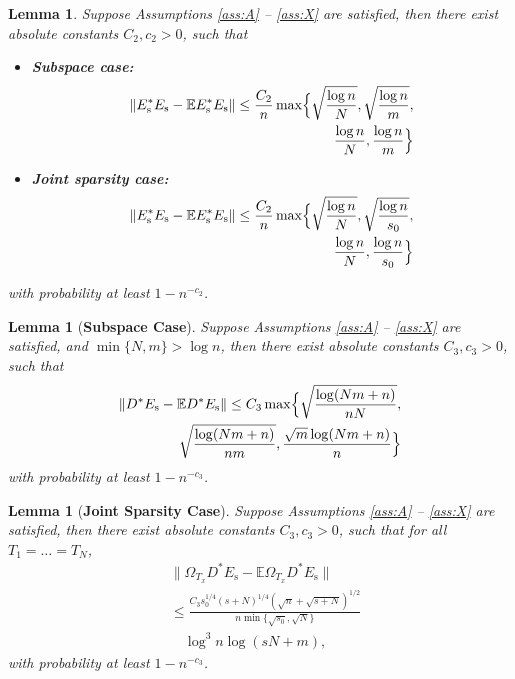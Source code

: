 \documentclass[11pt,journal]{IEEEtran}
\newcommand{\bbE}{\mathbb{E}}
\newcommand{\rms}{\mathrm{s}}
\newcommand{\norm}[1]{\|{#1}\|}
\newtheorem{lemma}[theorem]{Lemma}
\begin{document}
\begin{lemma} \label{lem:EsstarEs}
Suppose Assumptions \ref{ass:A} -- \ref{ass:X} are satisfied, then there exist absolute constants $C_2, c_2>0$, such that
\begin{itemize}
	\item \textbf{Subspace case:}
	\begin{align*}
\norm{E_\rms^*E_\rms - \bbE E_\rms^*E_\rms} \leq \frac{C_2}{n}\max\Bigl\{\sqrt{\frac{\log n}{N}},\sqrt{\frac{\log n}{m}}, \\
\frac{\log n}{N},\frac{\log n}{m}\Bigr\}
\end{align*}
	
	\item \textbf{Joint sparsity case:}
	\begin{align*}
\norm{E_\rms^*E_\rms - \bbE E_\rms^*E_\rms} \leq \frac{C_2}{n}\max\Bigl\{\sqrt{\frac{\log n}{N}},\sqrt{\frac{\log n}{s_0}}, \\
\frac{\log n}{N},\frac{\log n}{s_0}\Bigr\}
\end{align*}
\end{itemize}
with probability at least $1-n^{-c_2}$.
\end{lemma}



\begin{lemma}[\textbf{Subspace Case}] \label{lem:DstarEs}
Suppose Assumptions \ref{ass:A} -- \ref{ass:X} are satisfied, and $\min\{N,m\}>\log n$, then there exist absolute constants $C_3, c_3>0$, such that 
\begin{align*}
\norm{D^*E_\rms-\bbE D^*E_\rms} \leq C_3 \max\Bigl\{ \sqrt{\frac{\log (Nm+n)}{nN}}, \\
\sqrt{\frac{\log(Nm+n)}{nm}},\frac{\sqrt{m}\log(Nm+n)}{n}\Bigr\}
\end{align*}
with probability at least $1-n^{-c_3}$.
\end{lemma}

\begin{lemma}[\textbf{Joint Sparsity Case}] \label{lem:DstarEs_alt}
Suppose Assumptions \ref{ass:A} -- \ref{ass:X} are satisfied, then there exist absolute constants $C_3, c_3>0$, such that for all $T_1 = \dots = T_N$,
\begin{align*}
& \norm{\Omega_{T_x}D^*E_\rms-\bbE \Omega_{T_x}D^*E_\rms} \\
& \leq  \frac{C_3 s_0^{1/4} (s+N)^{1/4} (\sqrt{n}+\sqrt{s+N})^{1/2}}{n \min\{\sqrt{s_0}, \sqrt{N}\}} \\
&\quad \log^3 n \log(sN+m),
\end{align*}
with probability at least $1-n^{-c_3}$.
\end{lemma}
\end{document}
